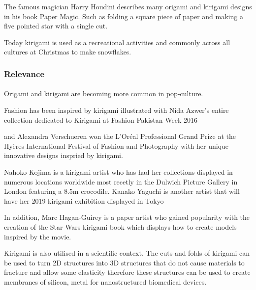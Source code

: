 \documentclass[11pt]{article}
\begin{document}
           
           The famous magician Harry Houdini describes many origami and kirigami designs in his book Paper Magic. Such as folding a square piece of paper and making a five pointed star with a single cut. %
           
           
           Today kirigami is used as a recreational activities and commonly across all cultures at Christmas to make snowflakes.
    
            \subsubsection{Relevance}
                \paragraph{} 
                Origami and kirigami are becoming more common in pop-culture. 
                
                Fashion has been inspired by kirigami illustrated with Nida Azwer's entire collection dedicated to Kirigami at Fashion Pakistan Week 2016 

                and Alexandra Verschueren won the L'Oréal Professional Grand Prize at the Hyères International Festival of Fashion and Photography with her unique innovative designs inspried by kirigami.  %
                
                Nahoko Kojima is a kirigami artist who has had her collections displayed in numerous locations worldwide most recetly in the Dulwich Picture Gallery in London featuring a 8.5m crocodile. %
                Kanako Yaguchi is another artist that will have her 2019 kirigami exhibition displayed in Tokyo %
                
                In addition, Marc Hagan-Guirey is a paper artist who gained popularity with the creation of the Star Wars kirigami book which displays how to create models inspired by the movie. %
            
                Kirigami is also utilised in a scientific context. The cuts and folds of kirigami can be used to turn 2D structures into 3D structures that do not cause materials to fracture and allow some elasticity therefore these structures can be used to create membranes of silicon, metal for nanostructured biomedical devices. %
                
\end{document}
